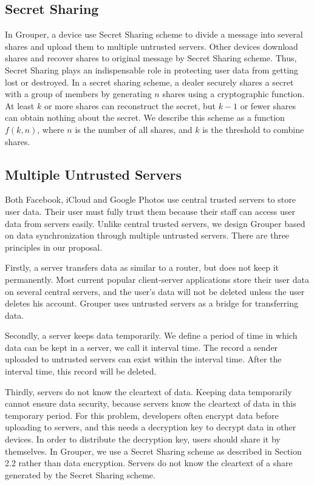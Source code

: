 \documentclass[twocolumn,10pt]{article}
\begin{document}
\subsection{Secret Sharing}
In Grouper, a device use Secret Sharing scheme to divide a message into several shares and upload them to multiple untrusted servers. Other devices download shares and recover shares to original message by Secret Sharing scheme. Thus, Secret Sharing plays an indispensable role in protecting user data from getting lost or destroyed. In a secret sharing scheme, a dealer securely shares a secret with a group of members by generating $n$ shares using a cryptographic function\cite{smith2013layered}. At least $k$ or more shares can reconstruct the secret, but $k-1$ or fewer shares can obtain nothing about the secret\cite{pang2005new}. We describe this scheme as a function $f(k, n)$, where $n$ is the number of all shares, and $k$ is the threshold to combine shares. 

\subsection{Multiple Untrusted Servers}

Both Facebook, iCloud and Google Photos use central trusted servers to store user data. Their user must fully trust them because their staff can access user data from servers easily. Unlike central trusted servers, we design Grouper based on data synchronization through multiple untrusted servers. There are three principles in our proposal. 

Firstly, a server transfers data as similar to a router, but does not keep it permanently. Most current popular client-server applications store their user data on several central servers, and the user's data will not be deleted unless the user deletes his account. Grouper uses untrusted servers as a bridge for transferring data.

Secondly, a server keeps data temporarily. We define a period of time in which data can be kept in a server, we call it interval time. The record a sender uploaded to untrusted servers can exist within the interval time. After the interval time, this record will be deleted.

Thirdly, servers do not know the cleartext of data. Keeping data temporarily cannot ensure data security, because servers know the cleartext of data in this temporary period. For this problem, developers often encrypt data before uploading to servers, and this needs a decryption key to decrypt data in other devices. In order to distribute the decryption key, users should share it by themselves. In Grouper, we use a Secret Sharing scheme as described in Section 2.2 rather than data encryption. Servers do not know the cleartext of a share generated by the Secret Sharing scheme.
\end{document}
